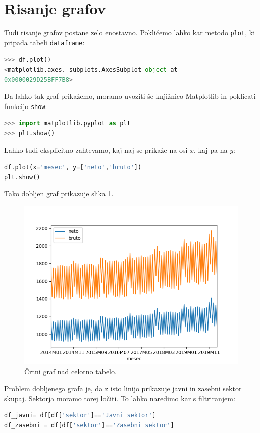 \section{Risanje grafov}
Tudi risanje grafov postane zelo enostavno. Pokličemo lahko kar metodo \texttt{plot}, ki pripada tabeli \texttt{dataframe}:
\begin{lstlisting}[language=python]
>>> df.plot()
<matplotlib.axes._subplots.AxesSubplot object at
0x0000029D25BFF7B8>
\end{lstlisting}
Da lahko tak graf prikažemo, moramo uvoziti še knjižnico Matplotlib in poklicati funkcijo \texttt{show}:
\begin{lstlisting}[language=python]
>>> import matplotlib.pyplot as plt
>>> plt.show()
\end{lstlisting}
Lahko tudi eksplicitno zahtevamo, kaj naj se prikaže na osi $x$, kaj pa na $y$:
\begin{lstlisting}[language=python]
df.plot(x='mesec', y=['neto','bruto'])
plt.show()
\end{lstlisting}
Tako dobljen graf prikazuje slika \ref{img:plt_pandas1}.
\begin{figure}
    \includegraphics[width=\linewidth]{img/plt_pandas1.png}
    \caption{Črtni graf nad celotno tabelo.}
    \label{img:plt_pandas1}
\end{figure}
Problem dobljenega grafa je, da z isto linijo prikazuje javni in zasebni sektor skupaj. Sektorja moramo torej ločiti. To lahko naredimo kar s filtriranjem:
\begin{lstlisting}[language=python]
df_javni= df[df['sektor']=='Javni sektor'] 
df_zasebni = df[df['sektor']=='Zasebni sektor']
\end{lstlisting}
